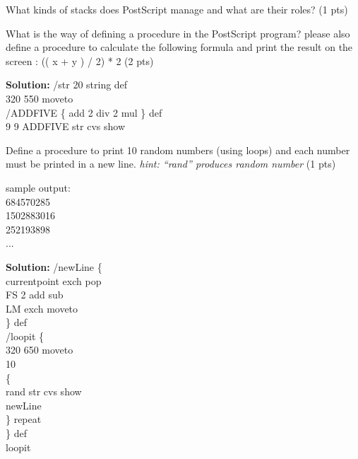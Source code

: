 \documentclass [11pt, a4wide, twoside]{article}
\begin{document}
\begin{myitemize}

\item What kinds of stacks does PostScript manage and what are their roles? (1 pts)


\item What is the way of defining a procedure in the PostScript program? please also define a procedure to calculate the following formula and print the result on the screen : (( x + y ) / 2) * 2
(2 pts)


\textbf{Solution:}
/str 20 string def \\
320 550 moveto \\
/ADDFIVE \{ add 2 div 2 mul \} def \\
9 9 ADDFIVE str cvs show

\item Define a procedure to print 10 random numbers (using loops) and each number must be printed in a new line. \emph{hint: ``rand'' produces random number}  (1 pts)

\small{sample output: \\
684570285 \\
1502883016 \\
252193898 \\
...
}

\textbf{Solution:}
/newLine \{ \\
	currentpoint exch pop \\
	FS 2 add sub \\
	LM exch moveto \\
\} def \\

/loopit \{ \\
320 650 moveto \\
10 \\
\{ \\
rand str cvs show \\
newLine \\
\} repeat \\
\} def \\
loopit




\end{myitemize}
\end{document}
